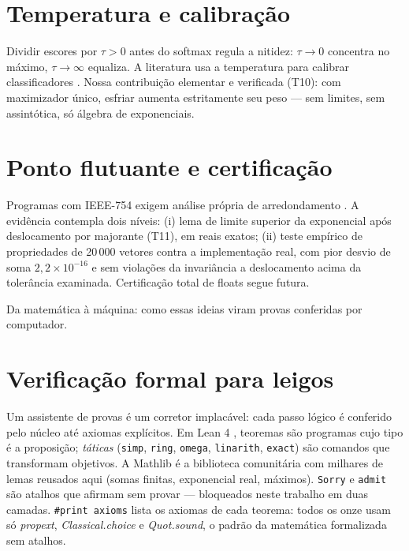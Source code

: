 \documentclass[12pt,openany,oneside,a4paper,brazil,chapter=TITLE]{abntex2}
\let\cite\citep
\begin{document}
\section{Temperatura e calibração}
Dividir escores por $\tau>0$ antes do softmax regula a nitidez: $\tau\to0$ concentra no máximo, $\tau\to\infty$ equaliza. A literatura usa a temperatura para calibrar classificadores \cite{komisarenko2024,xuan2025,xie2024}. Nossa contribuição elementar e verificada (T10): com maximizador único, esfriar aumenta estritamente seu peso --- sem limites, sem assintótica, só álgebra de exponenciais.
\section{Ponto flutuante e certificação}
Programas com IEEE-754 exigem análise própria de arredondamento \cite{bagnara2019,murray2026}. A evidência contempla dois níveis: (i) lema de limite superior da exponencial após deslocamento por majorante (T11), em reais exatos; (ii) teste empírico de propriedades de 20\,000 vetores contra a implementação real, com pior desvio de soma $2{,}2\times10^{-16}$ e sem violações da invariância a deslocamento acima da tolerância examinada. Certificação total de floats segue futura.



Da matemática à máquina: como essas ideias viram provas conferidas por computador.
\section{Verificação formal para leigos}
Um assistente de provas é um corretor implacável: cada passo lógico é conferido pelo núcleo até axiomas explícitos. Em Lean 4 \cite{moura2021}, teoremas são programas cujo tipo é a proposição; \textit{táticas} (\texttt{simp}, \texttt{ring}, \texttt{omega}, \texttt{linarith}, \texttt{exact}) são comandos que transformam objetivos. A Mathlib \cite{mathlib2020} é a biblioteca comunitária com milhares de lemas reusados aqui (somas finitas, exponencial real, máximos). \texttt{Sorry} e \texttt{admit} são atalhos que afirmam sem provar --- bloqueados neste trabalho em duas camadas. \texttt{\#print axioms} lista os axiomas de cada teorema: todos os onze usam só \textit{propext}, \textit{Classical.choice} e \textit{Quot.sound}, o padrão da matemática formalizada sem atalhos.
\end{document}
